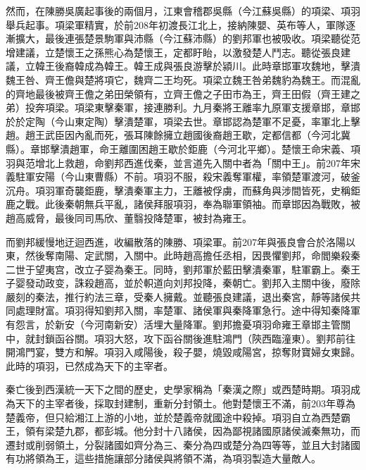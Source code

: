 然而，在陳勝吳廣起事後的兩個月，江東會稽郡吳縣（今江蘇吳縣）的項梁、項羽舉兵起事。項梁軍精實，於前208年初渡長江北上，接納陳嬰、英布等人，軍隊逐漸擴大，最後連張楚景駒軍與沛縣（今江蘇沛縣）的劉邦軍也被吸收。項梁聽從范增建議，立楚懷王之孫熊心為楚懷王，定都盱眙，以激發楚人鬥志。聽從張良建議，立韓王後裔韓成為韓王。韓王成與張良游擊於潁川。此時章邯軍攻魏地，擊潰魏王咎、齊王儋與楚將項它，魏齊二王均死。項梁立魏王咎弟魏豹為魏王。而混亂的齊地最後被齊王儋之弟田榮領有，立齊王儋之子田市為王，齊王田假（齊王建之弟）投奔項梁。項梁東擊秦軍，接連勝利。九月秦將王離率九原軍支援章邯，章邯於於定陶（今山東定陶）擊潰楚軍，項梁去世。章邯認為楚軍不足憂，率軍北上擊趙。趙王武臣因內亂而死，張耳陳餘擁立趙國後裔趙王歇，定都信都（今河北冀縣）。章邯擊潰趙軍，命王離圍困趙王歇於鉅鹿（今河北平鄉）。楚懷王命宋義、項羽與范增北上救趙，命劉邦西進伐秦，並言道先入關中者為「關中王」。前207年宋義駐軍安陽（今山東曹縣）不前。項羽不服，殺宋義奪軍權，率領楚軍渡河，破釜沉舟。項羽軍奇襲鉅鹿，擊潰秦軍主力，王離被俘虜，而蘇角與涉間皆死，史稱鉅鹿之戰。此後秦朝無兵平亂，諸侯拜服項羽，奉為聯軍領袖。而章邯因為戰敗，被趙高威脅，最後同司馬欣、董翳投降楚軍，被封為雍王。

而劉邦緩慢地迂迴西進，收編散落的陳勝、項梁軍。前207年與張良會合於洛陽以東，然後奪南陽、定武關，入關中。此時趙高擔任丞相，因畏懼劉邦，命閻樂殺秦二世于望夷宫，改立子婴為秦王。同時，劉邦軍於藍田擊潰秦軍，駐軍霸上。秦王子婴發动政变，誅殺趙高，並於軹道向刘邦投降，秦朝亡。劉邦入主關中後，廢除嚴刻的秦法，推行約法三章，受秦人擁戴。並聽張良建議，退出秦宮，靜等諸侯共同處理財富。項羽得知劉邦入關，率楚軍、諸侯軍與秦降軍急行。途中得知秦降軍有怨言，於新安（今河南新安）活埋大量降軍。劉邦擔憂項羽命雍王章邯主管關中，就封鎖函谷關。項羽大怒，攻下函谷關後進駐鴻門（陝西臨潼東）。劉邦前往開鴻門宴，雙方和解。項羽入咸陽後，殺子嬰，燒毀咸陽宮，掠奪財寶婦女東歸。此時的項羽，已然成為天下的主宰者。

秦亡後到西漢統一天下之間的歷史，史學家稱為「秦漢之際」或西楚時期。項羽成為天下的主宰者後，採取封建制，重新分封領土。他對楚懷王不滿，前203年尊為楚義帝，但只給湘江上游的小地，並於楚義帝就國途中殺掉。項羽自立為西楚霸王，領有梁楚九郡，都彭城。他分封十八諸侯，因為鄙視諸國原諸侯滅秦無功，而遷封或削弱領土，分裂諸國如齊分為三、秦分為四或楚分為四等等，並且大封諸國有功將領為王，這些措施讓部分諸侯與將領不滿，為項羽製造大量敵人。


